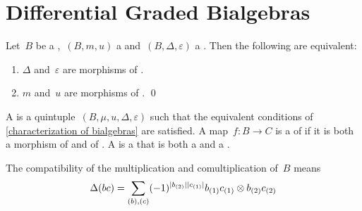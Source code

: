 \documentclass[a4paper,10pt,headings=standardclasses]{scrartcl}
\begin{document}
\section{Differential Graded Bialgebras}

\begin{lemma}
  \label{characterization of bialgebras}
  Let~$B$ be a {\dgv},~$(B, m, u)$ a {\dga} and~$(B, \Delta, \varepsilon)$ a {\dgc}.
  Then the following are equivalent:
  \begin{enumerate}
    \item
      $\Delta$ and~$\varepsilon$ are morphisms of {\dgas}.
    \item
      $m$ and~$u$ are morphisms of {\dgcs}.
    \qed
  \end{enumerate}
\end{lemma}


\begin{definition}
  A  is a quintuple~$(B, \mu, u, \Delta, \varepsilon)$ such that the equivalent conditions of \cref{characterization of bialgebras} are satisfied.
  A map~$f \colon B \to C$ is a  of {\dgbs} if it is both a morphism of {\dgas} and of {\dgcs}.
  A  is a {\dgsub} that is both a {\dgi} and a {\dgci}.
\end{definition}

\begin{remark}
  The compatibility of the multiplication and comultiplication of~$B$ means
  \begin{gather*}
    \Delta(bc)
    =
    \sum_{(b), (c)}
    (-1)^{\lvert b_{(2)}\rvert \lvert c_{(1)}\rvert}
    b_{(1)} c_{(1)} \otimes b_{(2)} c_{(2)}
  \end{gather*}

\end{remark}
\end{document}
